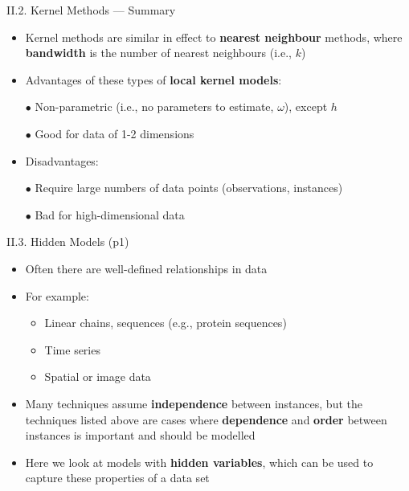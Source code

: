 \documentclass[handout]{beamer}
\newcommand{\strong}[1]{\textbf{\color{teal} #1}}
\newcommand{\stronger}[1]{\textbf{\color{purple} #1}}
\begin{document}
\begin{frame}{II.2. Kernel Methods --- Summary}
\begin{itemize}
\item Kernel methods are similar in effect to \textbf{nearest neighbour} methods, where \stronger{bandwidth} is the number of nearest neighbours (i.e., $k$)
\item[]
\item Advantages of these types of \stronger{local kernel models}:
\item[$\bullet$] Non-parametric (i.e., no parameters to estimate, $\omega$), except $h$
\item[$\bullet$] Good for data of 1-2 dimensions
\item[]
\item Disadvantages:
\item[$\bullet$] Require large numbers of data points (observations, instances)
\item[$\bullet$] Bad for high-dimensional data
\end{itemize}
\end{frame}
\begin{frame}{II.3. Hidden Models (p1)}
\begin{itemize}
\item Often there are well-defined relationships in data
\item For example:
	\begin{itemize}
	\item Linear chains, sequences (e.g., protein sequences)
	\item Time series
	\item Spatial or image data
	\end{itemize}
\item Many techniques assume \strong{independence} between instances, but the techniques listed above are cases where \strong{dependence} and \strong{order} between instances is important and should be modelled
\item Here we look at models with \stronger{hidden variables}, which can be used to capture these properties of a data set
\end{itemize}
\end{frame}
\end{document}
